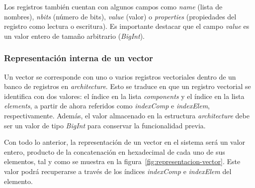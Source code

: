 Los registros también cuentan con algunos campos como \textit{name} (lista de nombres), \textit{nbits} (número de bits), \textit{value} (valor) o \textit{properties} (propiedades del registro como lectura o escritura). Es importante destacar que el campo \textit{value} es un valor entero de tamaño arbitrario (\textit{BigInt}).

\subsubsection{Representación interna de un vector}

Un vector se corresponde con uno o varios registros vectoriales dentro de un
banco de registros en \textit{architecture}. Esto se traduce en que un registro
vectorial se identifica con dos valores: el índice en la lista
\textit{components} y el índice en la lista \textit{elements}, a partir de
ahora referidos como \textit{indexComp} e \textit{indexElem}, respectivamente.
Además, el valor almacenado en la estructura \textit{architecture} debe ser un
valor de tipo \textit{BigInt} para conservar la funcionalidad previa.

Con todo lo anterior, la representación de un vector en el sistema será un
valor entero, producto de la concatenación en hexadecimal de cada uno de sus
elementos, tal y como se muestra en la figura~\ref{fig:representacion-vector}. Este valor podrá recuperarse a través de los
índices \textit{indexComp} e \textit{indexElem} del elemento.

